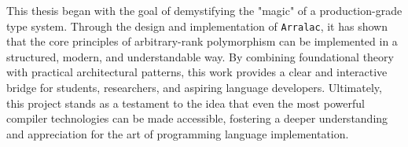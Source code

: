       
\enlargethispage{\baselineskip}
This thesis began with the goal of demystifying the "magic" of a production-grade type system. Through the design and implementation of \texttt{Arralac}, it has shown that the core principles of arbitrary-rank polymorphism can be implemented in a structured, modern, and understandable way. By combining foundational theory with practical architectural patterns, this work provides a clear and interactive bridge for students, researchers, and aspiring language developers. Ultimately, this project stands as a testament to the idea that even the most powerful compiler technologies can be made accessible, fostering a deeper understanding and appreciation for the art of programming language implementation.